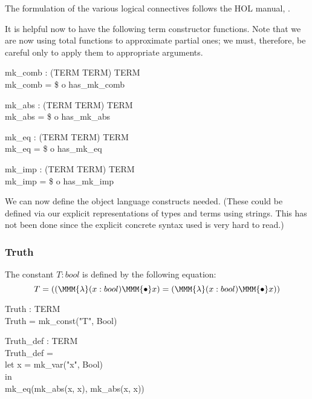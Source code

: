 \documentclass[a4paper,11pt,titlepage]{article}
\begin{document}
\begin{titlepage}
The formulation of the various logical connectives
follows the HOL manual, \cite{SRI89a}.

It is helpful now to
have the following term constructor functions.
Note that we are now using total functions to
approximate partial ones; we must, therefore, be
careful only to apply them to appropriate arguments.

\begin{HOLConst}
\+	\PrNL{}mk\_comb\PrNN{} : (TERM \MMM{\times} TERM) \MMM{\rightarrow} TERM\\
\PrPH{}
\+	mk\_comb = \$\MMM{\epsilon} o has\_mk\_comb\\
\end{HOLConst}
\begin{HOLConst}
\+	\PrNL{}mk\_abs\PrNN{} : (TERM \MMM{\times} TERM) \MMM{\rightarrow} TERM\\
\PrPH{}
\+	mk\_abs = \$\MMM{\epsilon} o has\_mk\_abs\\
\end{HOLConst}
\begin{HOLConst}
\+	\PrNL{}mk\_eq\PrNN{} : (TERM \MMM{\times} TERM) \MMM{\rightarrow} TERM\\
\PrPH{}
\+	mk\_eq = \$\MMM{\epsilon} o has\_mk\_eq\\
\end{HOLConst}
\begin{HOLConst}
\+	\PrNL{}mk\_imp\PrNN{} : (TERM \MMM{\times} TERM) \MMM{\rightarrow} TERM\\
\PrPH{}
\+	mk\_imp = \$\MMM{\epsilon} o has\_mk\_imp\\
\end{HOLConst}

We can now define the object language constructs needed.
(These could be defined via our explicit representations
of types and terms using strings. This has not been done
since the explicit concrete
syntax used is very  hard to read.)
\subsubsection{Truth}
The constant $T : bool$ is defined by the following equation:
$$T = ((\MMM{\lambda}(x:bool) \MMM{\bullet} x) = (\MMM{\lambda}(x:bool) \MMM{\bullet} x))$$

\begin{HOLConst}
\+	\PrNL{}Truth\PrNN{} : TERM\\
\PrPH{}
\+	Truth = mk\_const("T", Bool)\\
\end{HOLConst}
\begin{HOLConst}
\+	\PrNL{}Truth\_def\PrNN{} : TERM\\
\PrPH{}
\+	Truth\_def =\\
\+	let x = mk\_var("x", Bool)\\
\+	in\\
\+	mk\_eq(mk\_abs(x, x), mk\_abs(x, x))\\
\end{HOLConst}

\end{titlepage}
\end{document}

